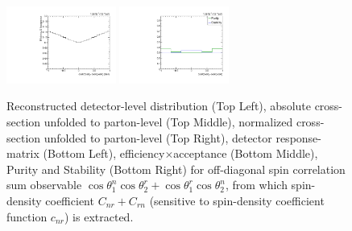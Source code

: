 \begin{figure}[htb]
\begin{center}
 \includegraphics[width=0.32\textwidth]{fig_fullRun2UL/unfolding/combined/TotEff_c_Pnr.pdf}
 \includegraphics[width=0.32\textwidth]{fig_fullRun2UL/unfolding/combined/PurStab_c_Pnr.pdf} \\
\caption{Reconstructed detector-level distribution (Top Left), absolute cross-section unfolded to parton-level (Top Middle), normalized cross-section unfolded to parton-level (Top Right), detector response-matrix (Bottom Left), efficiency$\times$acceptance (Bottom Middle), Purity and Stability (Bottom Right) for off-diagonal spin correlation sum observable $\cos\theta_{1}^{n}\cos\theta_{2}^{r}+\cos\theta_{1}^{r}\cos\theta_{2}^{n}$, from which spin-density coefficient $C_{nr}+C_{rn}$ (sensitive to spin-density coefficient function $c_{n r}$) is extracted.}
\label{fig:c_Pnr}
\end{center}
\end{figure}
\clearpage
